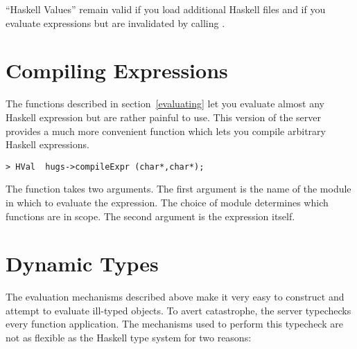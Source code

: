 ``Haskell Values'' remain valid if you load additional Haskell files
and if you evaluate expressions but are invalidated by calling
. 


\section{Compiling Expressions}

The functions described in section~\ref{evaluating} let you evaluate
almost any Haskell expression but are rather painful to use.  This
version of the server provides a much more convenient function which
lets you compile arbitrary Haskell expressions.

\begin{verbatim}
> HVal  hugs->compileExpr (char*,char*);
\end{verbatim}

The function  takes two arguments.  The first
argument is the name of the module in which to evaluate the
expression.  The choice of module determines which functions are in
scope.  The second argument is the expression itself.




\section{Dynamic Types}\label{dynamic} 

The evaluation mechanisms described above make it very easy to
construct and attempt to evaluate ill-typed objects.  To avert
catastrophe, the server typechecks every function application.
The mechanisms used to perform this typecheck are not as flexible
as the Haskell type system for two reasons:

